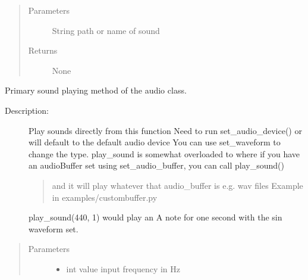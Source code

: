 \documentclass[letterpaper,10pt,english]{sphinxmanual}
\begin{document}
\begin{fulllineitems}
\begin{fulllineitems}
\begin{description}
\end{description}
\begin{quote}\begin{description}
\item[{Parameters}] \leavevmode
\sphinxAtStartPar
{} \textendash{} String path or name of sound

\item[{Returns}] \leavevmode
\sphinxAtStartPar
None

\end{description}\end{quote}

\end{fulllineitems}


\begin{fulllineitems}
\label{\detokenize{dpav:dpav.audio.Audio.play_sound}}
\sphinxAtStartPar
Primary sound playing method of the audio class.
\begin{description}
\item[{Description:}] \leavevmode
\sphinxAtStartPar
Play sounds directly from this function
Need to run set\_audio\_device() or will default to the default audio device
You can use set\_waveform to change the type.
play\_sound is somewhat overloaded to where if you have an audioBuffer set using set\_audio\_buffer, you can call play\_sound()
\begin{quote}

\sphinxAtStartPar
and it will play whatever that audio\_buffer is e.g. wav files
Example in examples/custombuffer.py
\end{quote}

\sphinxAtStartPar
play\_sound(440, 1) would play an A note for one second with the sin waveform set.

\end{description}
\begin{quote}\begin{description}
\item[{Parameters}] \leavevmode\begin{itemize}
\item {} 
\sphinxAtStartPar
{} \textendash{} int value \sphinxhyphen{} input frequency in Hz


\end{itemize}
\end{description}
\end{quote}
\end{fulllineitems}
\end{fulllineitems}
\end{document}
